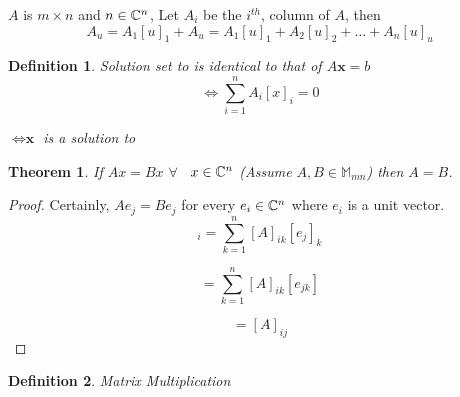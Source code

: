 \documentclass{exam}
\newtheorem{thm}{Theorem}[section]
\newtheorem{deff}{Definition}[section]
\begin{document}
\begin{center}
  \(A\) is \(m \times n\) and \(n\in\mathbb{C}^{n}\), Let \(A_i\) be the \(i^{th}\),
  column of \(A\), then
  \[
  A_u = A_1[u]_1 + A_u = A_1[u]_1 + A_2[u]_2 + \dots + A_n [u]_u
  \]
\end{center}

\bigskip

\begin{deff}
  Solution set to  is identical to that of \(A\textbf{x}=b\)
  \[\iff \sum_{i=1}^{n} A_i[x]_i=0\]
  \begin{center}
    \(\iff \textbf{x}\) is a solution to 
  \end{center}
\end{deff}





\bigskip
\bigskip

\begin{thm}
  If \(Ax = Bx\) $\forall$~ \(x\in\mathbb{C}^{n}\) (Assume \(A, B \in\mathbb{M}_{mn}\)) then \(A=B\).
\end{thm}

\begin{proof}
Certainly, \(Ae_j = Be_j\) for every \(e_i \in\mathbb{C}^{n}\) where \(e_i\) is a unit vector.
\begin{equation}
  [Ae_j]_i = \sum_{k=1}^{n}[A]_{ik}[e_j]_k
\end{equation}

\begin{equation}
  = \sum_{k=1}^{n}[A]_{ik}[e_{jk}]
\end{equation}

\begin{equation}
  = [A]_{ij}
\end{equation}

\end{proof}

\begin{deff}
Matrix Multiplication
\end{deff}
\end{document}
